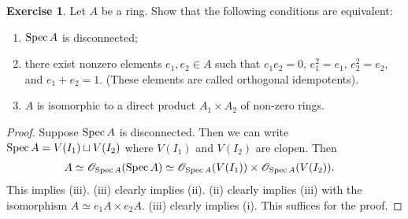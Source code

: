 \documentclass[]{pcmi}
\theoremstyle{plain}
\theoremstyle{definition}
\newtheorem{Exercise}{Exercise}
\theoremstyle{remark}
\begin{document}
\begin{Exercise}
    Let $A$ be a ring. Show that the following conditions are equivalent:
    \begin{enumerate}[label = (\roman*)]
        \item $\operatorname{Spec} A$ is disconnected; 
        \item there exist nonzero elements $e_1, e_2 \in A$ such that $e_1e_2 = 0$, $e_1^2 = e_1$, $e_2^2 = e_2$, and $e_1 + e_2 = 1$. (These elements are called orthogonal idempotents). 
        \item $A$ is isomorphic to a direct product $A_1 \times A_2$ of non-zero rings. 
    \end{enumerate}
\end{Exercise}

\begin{proof}
    Suppose $\operatorname{Spec} A$ is disconnected. Then we can write $\operatorname{Spec} A = V(I_1) \sqcup V(I_2)$ where $V(I_1)$ and $V(I_2)$ are clopen. Then 
    \begin{align*}
        A \simeq \mathscr{O}_{\operatorname{Spec} A}(\operatorname{Spec} A) & \simeq \mathscr{O}_{\operatorname{Spec} A} (V(I_1)) \times \mathscr{O}_{\operatorname{Spec} A}(V(I_2)).
    \end{align*}
    This implies (iii). (iii) clearly implies (ii). (ii) clearly implies (iii) with the isomorphism $A \simeq e_1A \times e_2A$. (iii) clearly implies (i). This suffices for the proof. 
\end{proof}






%    
%
%
%
%             
%   
%
%  

\bibspread



\vfill\eject
\end{document}
